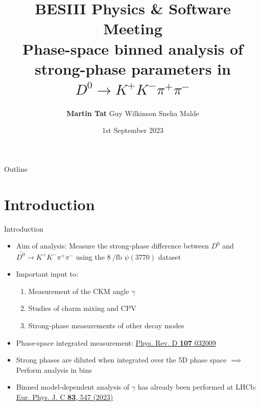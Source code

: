 \documentclass{beamer}
\title[$D^0\to K^+K^-\pi^+\pi^-$]{BESIII Physics \& Software Meeting \\Phase-space binned analysis of strong-phase parameters in $D^0\to K^+K^-\pi^+\pi^-$}
\author[Martin Tat]{\textbf{Martin Tat} \hspace{0.54em} Guy Wilkinson \hspace{0.54em} Sneha Malde}
\institute{University of Oxford}
\date{1st September 2023}
\begin{document}
\begin{frame}
  \titlepage
\end{frame}

\begin{frame}{Outline}
  \tableofcontents
\end{frame}

\section{Introduction}
\begin{frame}{Introduction}
  \begin{itemize}
    \setlength\itemsep{1.0em}
    \item{Aim of analysis: Measure the strong-phase difference between $D^0$ and $\bar{D^0}\to K^+K^-\pi^+\pi^-$ using the $\SI{8}{\per\femto\barn}$ $\psi(3770)$ dataset}
    \item{Important input to:}
    \begin{enumerate}
      \setlength\itemsep{0.1em}
      \item{Measurement of the CKM angle $\gamma$}
      \item{Studies of charm mixing and CPV}
      \item{Strong-phase measurements of other decay modes}
    \end{enumerate}
    \item{Phase-space integrated measurement: \href{https://journals.aps.org/prd/abstract/10.1103/PhysRevD.107.032009}{Phys. Rev. D \textbf{107} 032009}}
    \item{Strong phases are diluted when integrated over the 5D phase space $\implies$ Perform analysis in bins}
    \item{Binned model-dependent analysis of $\gamma$ has already been performed at LHCb: \href{https://link.springer.com/article/10.1140/epjc/s10052-023-11560-5}{Eur. Phys. J. C \textbf{83}, 547 (2023)}}
  \end{itemize}
\end{frame}
\end{document}
